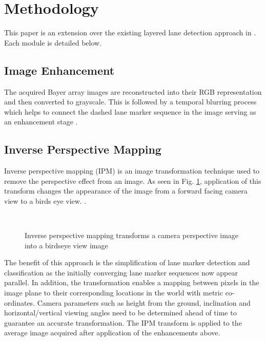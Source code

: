 \documentclass{article}
\begin{document}
\section{Methodology}
\label{sec:methodology}
This paper is an extension over the existing layered lane detection approach in \cite{borkar_layered_2009}. Each module is detailed below.
\subsection{Image Enhancement}
The acquired Bayer array images are reconstructed into their RGB representation and then converted to grayscale. This is followed by a temporal blurring process which helps to connect the dashed lane marker sequence in the image serving as an enhancement stage \cite{borkar_layered_2009}.
\subsection{Inverse Perspective Mapping}
Inverse perspective mapping (IPM) is an image transformation technique used to remove the perspective effect from an image. As seen in Fig. \ref{fig:ipm}, application of this transform changes the appearance of the image from a forward facing camera view to a birds eye view. \cite{sehestedt_robust_2007,shu_vision_2004,bertozzi_gold:parallel_1998}.
\begin{figure}[htb]
  \centering
    \hspace{0.00001in}
      \\
  \caption{Inverse perspective mapping transforms a camera perspective image into a birdseye view image}
  \label{fig:ipm}
\end{figure}
The benefit of this approach is the simplification of lane marker detection and classification as the initially converging lane marker sequences now appear parallel. In addition, the transformation enables a mapping between pixels in the image plane to their corresponding locations in the world with metric co-ordinates. Camera parameters such as height from the ground, inclination and horizontal/vertical viewing angles need to be determined ahead of time to guarantee an accurate transformation. The IPM transform is applied to the average image acquired after application of the enhancements above.
\end{document}
